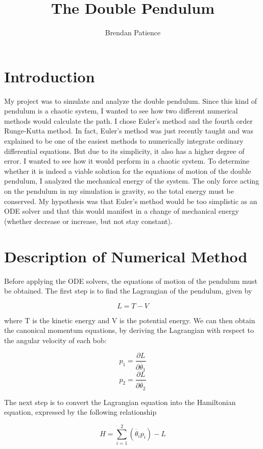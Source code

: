 \documentclass[a4paper,12pt]{article}
\title{The Double Pendulum}
\author{Brendan Patience}
\begin{document}
\maketitle

\section*{Introduction}

My project was to simulate and analyze the double pendulum. Since this kind
of pendulum is a chaotic system, I wanted to see how two different numerical
methods would calculate the path. I chose Euler's method and the fourth
order Runge-Kutta method. In fact, Euler's method was just recently taught
and was explained to be one  of the easiest methods to numerically integrate
ordinary differential equations. But due to its simplicity, it also has a
higher degree of error. I wanted to see how it would perform in a chaotic
system. To determine whether it is indeed a viable solution for the equations
of motion of the double pendulum, I analyzed the mechanical energy of the
system. The only force acting on the pendulum in my simulation is gravity, 
so the total energy must be conserved. My hypothesis was that Euler's method
would be too simplistic as an ODE solver and that this would manifest in
a change of mechanical energy (whether decrease or increase, but not stay
constant).

\section*{Description of Numerical Method}

Before applying the ODE solvers, the equations of motion of the pendulum
must be obtained. The first step is to find the Lagrangian of the 
pendulum, given by

\[L = T - V \]

where T is the kinetic energy and V is the potential energy. We can then
obtain the canonical momentum equations, by deriving the Lagrangian with
respect to the angular velocity of each bob:

\[p_1 = \frac{\partial L}{\partial \dot{\theta_1}} \]
\[p_2 = \frac{\partial L}{\partial \dot{\theta_2}} \]

The next step is to convert the Lagrangian equation into the Hamiltonian
equation, expressed by the following relationship

\[H = \sum_{i=1}^{2} \left( \dot{\theta_i} p_i \right) - L \]
\end{document}
